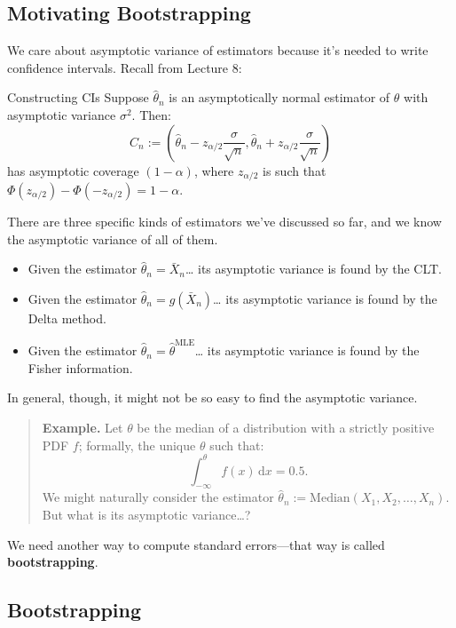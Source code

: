\subsection{Motivating Bootstrapping}

We care about asymptotic variance of estimators
because it's needed to write confidence intervals.
Recall from Lecture 8:

\begin{theorem}{Constructing CIs}
    Suppose $\hat{\theta}_n$ is an asymptotically normal estimator of $\theta$
    with asymptotic variance $\sigma^2$.  Then:
    \[ C_n := \left( \hat{\theta}_n - z_{\alpha / 2} \frac{\sigma}{\sqrt{n}},
    \hat{\theta}_n + z_{\alpha / 2} \frac{\sigma}{\sqrt{n}} \right) \]
    has asymptotic coverage $(1 - \alpha)$, where $z_{\alpha / 2}$
    is such that $\Phi(z_{\alpha / 2}) - \Phi(-z_{\alpha / 2}) = 1 - \alpha$.
\end{theorem}

There are three specific kinds of estimators
we've discussed so far, and we know the asymptotic variance of all of them.
\begin{itemize}
    \item Given the estimator $\hat{\theta}_n = \bar{X}_n$\dots
    its asymptotic variance is found by the CLT.
    \item Given the estimator $\hat{\theta}_n = g(\bar{X}_n)$\dots
    its asymptotic variance is found by the Delta method.
    \item Given the estimator $\hat{\theta}_n = \hat{\theta}^{\mathrm{MLE}}$\dots
    its asymptotic variance is found by the Fisher information.
\end{itemize}
In general, though, it might not be so easy to find the asymptotic variance.
\begin{quote}
    \textbf{Example.} Let $\theta$ be the median of a distribution
    with a strictly positive PDF $f$;
    formally, the unique $\theta$ such that:
    \[ \int_{-\infty}^{\theta} f(x) \, \mathrm{d}x = 0.5. \]
    We might naturally consider the estimator $\hat{\theta}_n :=
    \mathrm{Median}(X_1, X_2, \dots, X_n)$.
    But what is its asymptotic variance\dots?
\end{quote}
We need another way to compute standard errors---that way is called \textbf{bootstrapping}.

\subsection{Bootstrapping}

